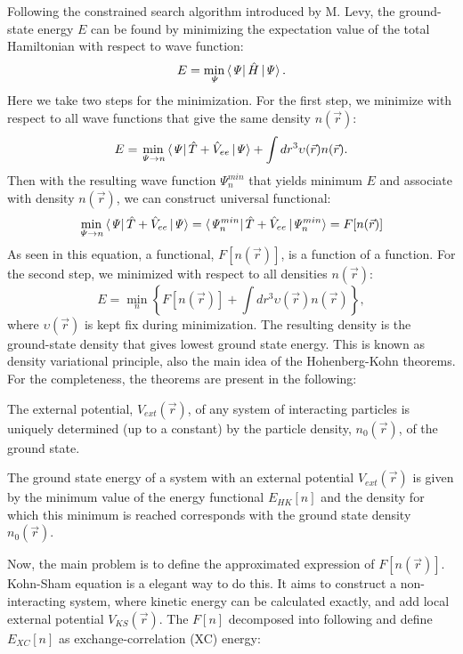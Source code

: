 Following the constrained search algorithm introduced by M. Levy\cite{Levy1979}, the ground-state energy $E$ can be found by minimizing the expectation value of the total Hamiltonian with respect to wave function:
\begin{equation}
E=\min_\mathit{\Psi}\bra{\mathit{\Psi}}\hat{H}\ket{\mathit{\Psi}}.
\end{equation}
Here we take two steps for the minimization. For the first step, we minimize with respect to all wave functions that give the same density $n(\vec{r})$:
\begin{equation}
E=\min_{\mathit{\Psi}\rightarrow n}\bra{\mathit{\Psi}}\hat{T}+\hat{V}_{ee}\ket{\mathit{\Psi}}+\int dr^3\upsilon(\vec{r})n(\vec{r}).
\end{equation}
Then with the resulting wave function $\mathit{\Psi}^{min}_n$ that yields minimum $E$ and associate with density $n(\vec{r})$, we can construct universal functional:
\begin{equation}
\min_{\mathit{\Psi}\rightarrow n}\bra{\mathit{\Psi}}\hat{T}+\hat{V}_{ee}\ket{\mathit{\Psi}}=\bra{\mathit{\Psi}^{min}_n}\hat{T}+\hat{V}_{ee}\ket{\mathit{\Psi}^{min}_n}=F[n(\vec{r})]
\end{equation}
As seen in this equation, a functional, $F[n(\vec{r})]$, is a function of a function. For the second step, we minimized with respect to all densities $n(\vec{r})$:
\begin{equation}
E=\min_n \left\lbrace F[n(\vec{r})] + \int dr^3\upsilon(\vec{r})n(\vec{r}) \right\rbrace,
\end{equation}
where $\upsilon(\vec{r})$ is kept fix during minimization. The resulting density is the ground-state density that gives lowest ground state energy. This is known as density variational principle, also the main idea of the Hohenberg-Kohn theorems. For the completeness, the theorems are present in the following:
\begin{theorem}
The external potential, $V_{ext}(\vec{r})$, of any system of interacting particles is uniquely determined (up to a constant) by the particle density, $n_0(\vec{r})$, of the ground state.
\end{theorem}
\begin{theorem}
The ground state energy of a system with an external potential $V_{ext}(\vec{r})$ is given by the minimum value of the energy functional $E_{HK} [n]$ and the density for which this minimum is reached corresponds with the ground state density $n_0(\vec{r})$.
\end{theorem}
Now, the main problem is to define the approximated expression of $F[n(\vec{r})]$. Kohn-Sham equation is a elegant way to do this. It aims to construct a non-interacting system, where kinetic energy can be calculated exactly, and add local external potential $V_{KS}(\vec{r})$. The $F[n]$ decomposed into following and define $E_{XC}[n]$ as exchange-correlation (XC) energy:

